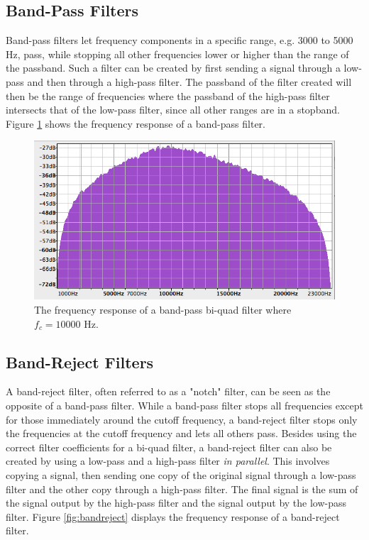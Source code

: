 \documentclass[12pt,twoside]{report}
\begin{document}
\subsection{Band-Pass Filters}

Band-pass filters let frequency components in a specific range, e.g. 3000 to 5000 Hz, pass, while stopping all other frequencies lower or higher than the range of the passband. Such a filter can be created by first sending a signal through a low-pass and then through a high-pass filter. The passband of the filter created will then be the range of frequencies where the passband of the high-pass filter intersects that of the low-pass filter, since all other ranges are in a stopband. Figure \ref{fig:bandpass} shows the frequency response of a band-pass filter.

\begin{figure}[p!]
  \includegraphics[scale=0.6]{img/bandpass}
  \caption{The frequency response of a band-pass bi-quad filter where $f_{c} = 10000$ Hz.}
  \label{fig:bandpass}
\end{figure}

\subsection{Band-Reject Filters}

A band-reject filter, often referred to as a "notch" filter, can be seen as the opposite of a band-pass filter. While a band-pass filter stops all frequencies except for those immediately around the cutoff frequency, a band-reject filter stops only the frequencies at the cutoff frequency and lets all others pass. Besides using the correct filter coefficients for a bi-quad filter, a band-reject filter can also be created by using a low-pass and a high-pass filter \emph{in parallel}. This involves copying a signal, then sending one copy of the original signal through a low-pass filter and the other copy through a high-pass filter. The final signal is the sum of the signal output by the high-pass filter and the signal output by the low-pass filter. Figure \ref{fig:bandreject} displays the frequency response of a band-reject filter.
\end{document}
